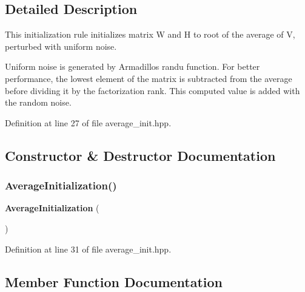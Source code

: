 \subsection{Detailed Description}
This initialization rule initializes matrix W and H to root of the average of V, perturbed with uniform noise. 

Uniform noise is generated by Armadillo\textquotesingle{}s \textquotesingle{}randu\textquotesingle{} function. For better performance, the lowest element of the matrix is subtracted from the average before dividing it by the factorization rank. This computed value is added with the random noise. 

Definition at line 27 of file average\+\_\+init.\+hpp.



\subsection{Constructor \& Destructor Documentation}
\mbox{\label{classmlpack_1_1amf_1_1AverageInitialization_a202e4b31ec0c19e8d2980b08b099ba6a}} 
\subsubsection{Average\+Initialization()}
{\footnotesize\ttfamily \textbf{ Average\+Initialization} (\begin{DoxyParamCaption}{ }\end{DoxyParamCaption})\hspace{0.3cm}{\ttfamily [inline]}}



Definition at line 31 of file average\+\_\+init.\+hpp.



\subsection{Member Function Documentation}
\mbox{\label{classmlpack_1_1amf_1_1AverageInitialization_a02a3610958f42b7dbef8bd5063ceaee7}} 
